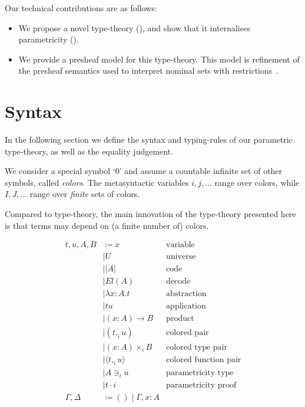\documentclass[english]{PaperTools/latex/lipics}
\newcommand\CP[3]{(#2,_{#1} #3)}
\newcommand\CTimes[2]{(#2) ×_{#1}}
\newcommand\param[1]{\!\cdot\!#1}
\newcommand\op[1]{∋_{#1}}
\newcommand\fp[3]{⟨#2 ,_{#1} #3⟩}
\newcommand\comment[1]{}
\begin{document}
Our technical contributions are as follows:
\begin{itemize}
\item We propose a novel type-theory (), and show
  that it internalises parametricity ().
\item We provide a presheaf model for this type-theory.
      This model is refinement of the presheaf semantics used to
      interpret nominal sets with
      restrictions~\citep{bezem2014model,DBLP:journals/corr/Pitts14}.
\end{itemize}

\section{Syntax}
\label{sec:syntax}
In the following section we define the syntax and typing-rules of our
parametric type-theory, as well as the equality judgement.

We consider a special symbol ‘0’ and assume a countable infinite set of other
symbols, called \emph{colors}.
The metasyntactic variables $i,j,\ldots$ range over colors, while
$I,J,…$ range over \emph{finite} sets of colors.

Compared to type-theory, the main innovation of the type-theory
presented here is that terms may depend on (a finite number of)
colors.
\begin{definition}
  \begin{align*}
    t,u,A,B & \coloneqq x & \text {variable} \\
            & \mid U & \text{universe} \\ 
            & \mid |A| & \text{code} \\ 
            & \mid El(A) & \text{decode} \\ 
            & \mid λx:A. t & \text{abstraction} \\
            & \mid t u & \text{application} \\ 
            & \mid (x:A) → B & \text{product} \\
            & \mid \CP i t u & \text{colored pair} \\
            & \mid \CTimes i {x:A} B  & \text{colored type pair} \\
            & \mid \fp i t u & \text{colored function pair}\\
            & \mid A \op i u & \text{parametricity type} \\
            & \mid t \param i & \text{parametricity proof} \\
    \Gamma,\Delta & \coloneqq () \mid \Gamma,x:A
  \end{align*}
\end{definition}
\end{document}

